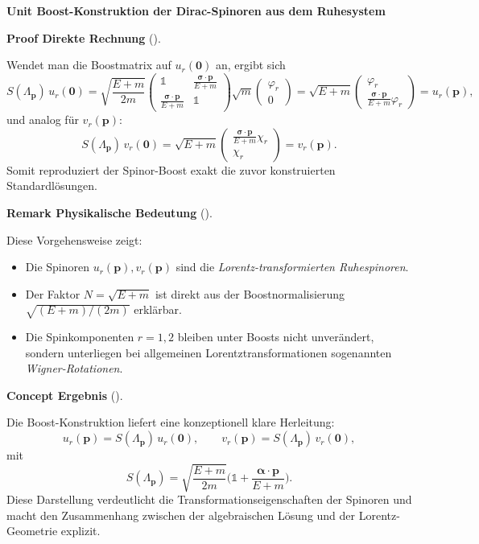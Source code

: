 \documentclass[10pt, letterpaper]{article}
\newcommand{\CustomHeading}[3]{%
  \par\medskip\noindent%
  \textbf{#1 #2} \textnormal{(#3)}.\enskip%
}
\newenvironment{REM}[2]{\begin{unitbox}\CustomHeading{Remark}{#1}{#2}}{\end{unitbox}}
\newenvironment{CONC}[2]{\begin{unitbox}\CustomHeading{Concept}{#1}{#2}}{\end{unitbox}}
\newenvironment{PROOF}[2]{\begin{unitbox}\CustomHeading{Proof}{#1}{#2}}{\end{unitbox}}
\newenvironment{unit}[1]
  {\begin{unitbox}\textbf{Unit #1}\par\smallskip}
  {\end{unitbox}}
\begin{document}
\begin{unit}{Boost-Konstruktion der Dirac-Spinoren aus dem Ruhesystem}
\begin{PROOF}{Direkte Rechnung}{}
Wendet man die Boostmatrix auf $u_r(\mathbf 0)$ an, ergibt sich
\[
S(\Lambda_{\mathbf p})\,u_r(\mathbf 0)
=\sqrt{\frac{E+m}{2m}}
\begin{pmatrix}
\mathbb 1 & \frac{\boldsymbol{\sigma}\cdot\mathbf p}{E+m}\\[2pt]
\frac{\boldsymbol{\sigma}\cdot\mathbf p}{E+m} & \mathbb 1
\end{pmatrix}
\sqrt{m}\begin{pmatrix}\varphi_r\\0\end{pmatrix}
=\sqrt{E+m}\begin{pmatrix}
\varphi_r\\[2pt]\frac{\boldsymbol{\sigma}\cdot\mathbf p}{E+m}\varphi_r
\end{pmatrix}
=u_r(\mathbf p),
\]
und analog für $v_r(\mathbf p)$:
\[
S(\Lambda_{\mathbf p})\,v_r(\mathbf 0)
=\sqrt{E+m}\begin{pmatrix}
\frac{\boldsymbol{\sigma}\cdot\mathbf p}{E+m}\chi_r\\[2pt]\chi_r
\end{pmatrix}
=v_r(\mathbf p).
\]
Somit reproduziert der Spinor-Boost exakt die zuvor konstruierten Standardlösungen.
\end{PROOF}

\begin{REM}{Physikalische Bedeutung}{}
Diese Vorgehensweise zeigt:
\begin{itemize}
\item Die Spinoren $u_r(\mathbf p),v_r(\mathbf p)$ sind die \emph{Lorentz-transformierten Ruhespinoren}.
\item Der Faktor $N=\sqrt{E+m}$ ist direkt aus der Boostnormalisierung $\sqrt{(E+m)/(2m)}$ erklärbar.
\item Die Spinkomponenten $r=1,2$ bleiben unter Boosts nicht unverändert, sondern unterliegen bei allgemeinen Lorentztransformationen sogenannten \emph{Wigner-Rotationen}.
\end{itemize}
\end{REM}

\begin{CONC}{Ergebnis}{}
Die Boost-Konstruktion liefert eine konzeptionell klare Herleitung:
\[
\boxed{
u_r(\mathbf p)=S(\Lambda_{\mathbf p})\,u_r(\mathbf 0),\qquad
v_r(\mathbf p)=S(\Lambda_{\mathbf p})\,v_r(\mathbf 0),
}
\]
mit
\[
S(\Lambda_{\mathbf p})=\sqrt{\frac{E+m}{2m}}\Big(\mathbb 1+\frac{\boldsymbol{\alpha}\cdot\mathbf p}{E+m}\Big).
\]
Diese Darstellung verdeutlicht die Transformationseigenschaften der Spinoren und macht den Zusammenhang zwischen der algebraischen Lösung und der Lorentz-Geometrie explizit.
\end{CONC}

\end{unit}
\end{document}

